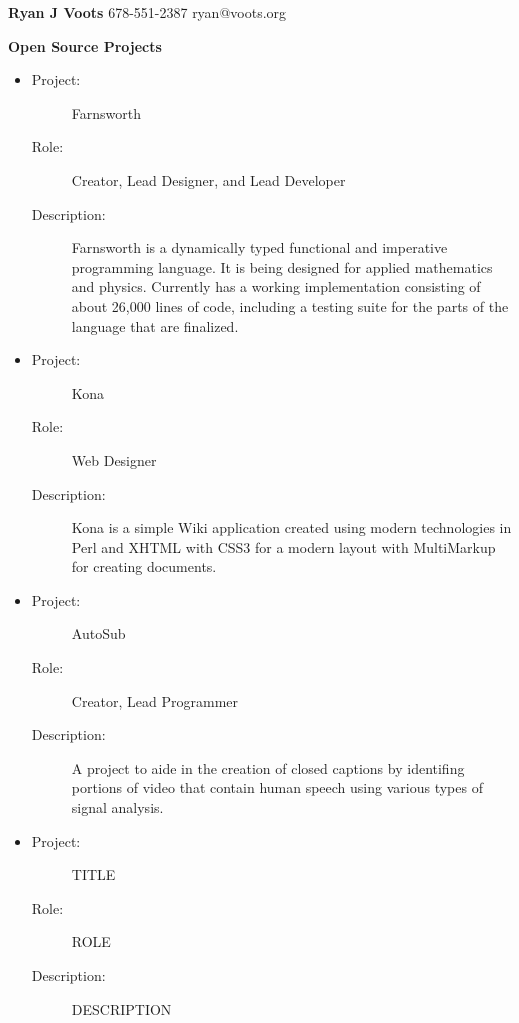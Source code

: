 \documentclass[11pt]{article}
\begin{document}
\textbf{Ryan J Voots}
678-551-2387
ryan@voots.org

\vspace{0.1in}

{\large \textbf{Open Source Projects}}
	\begin{itemize}
	\item
		\begin{description}
		\item[Project:] Farnsworth 
		\item[Role:] Creator, Lead Designer, and Lead Developer 
		\item[Description:] Farnsworth is a dynamically typed functional and imperative programming language.  It is being designed for applied mathematics and physics.  Currently has a working implementation consisting of about 26,000 lines of code, including a testing suite for the parts of the language that are finalized.
		\end{description}

        \item
                \begin{description}
                \item[Project:] Kona
                \item[Role:] Web Designer
                \item[Description:] Kona is a simple Wiki application created using modern technologies in Perl and XHTML with CSS3 for a modern layout with MultiMarkup for creating documents.
		\end{description}

        \item
                \begin{description}  
                \item[Project:] AutoSub
                \item[Role:] Creator, Lead Programmer
                \item[Description:] A project to aide in the creation of closed captions by identifing portions of video that contain human speech using various types of signal analysis.
                \end{description}

	\item
                \begin{description}
                \item[Project:] TITLE
                \item[Role:] ROLE
                \item[Description:] DESCRIPTION
		\end{description}

	\end{itemize}
\end{document}
